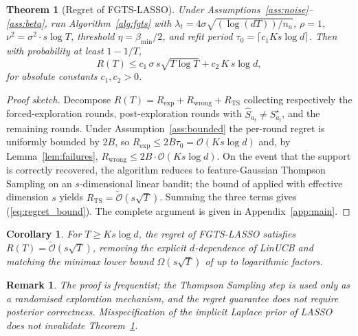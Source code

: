 \documentclass[journal,twoside,web]{ieeecolor}
\newtheorem{theorem}{Theorem}
\newtheorem{corollary}{Corollary}
\newtheorem{remark}{Remark}
\begin{document}
\begin{theorem}[Regret of FGTS-LASSO]\label{thm:main}
Under Assumptions~\ref{ass:noise}--\ref{ass:beta}, run Algorithm~\ref{alg:fgts} with $\lambda_t = 4\sigma\sqrt{(\log(dT))/n_a}$, $\rho = 1$, $\nu^2 = \sigma^2 \cdot s\log T$, threshold $\eta = \beta_{\min}/2$, and refit period $\tau_0 = \lceil c_1 K s\log d\rceil$. Then with probability at least $1 - 1/T$,
\begin{equation}
R(T) \leq c_1\, \sigma\, s\sqrt{T \log T} + c_2\, K\, s \log d,
\label{eq:regret_bound}
\end{equation}
for absolute constants $c_1, c_2 > 0$.
\end{theorem}

\begin{proof}[Proof sketch]
Decompose $R(T) = R_{\mathrm{exp}} + R_{\mathrm{wrong}} + R_{\mathrm{TS}}$ collecting respectively the forced-exploration rounds, post-exploration rounds with $\hat{S}_{a_t} \neq S^{\star}_{a_t}$, and the remaining rounds. Under Assumption~\ref{ass:bounded} the per-round regret is uniformly bounded by $2B$, so $R_{\mathrm{exp}} \leq 2B\tau_0 = \mathcal{O}(Ks\log d)$ and, by Lemma~\ref{lem:failures}, $R_{\mathrm{wrong}} \leq 2B \cdot \mathcal{O}(Ks\log d)$. On the event that the support is correctly recovered, the algorithm reduces to feature-Gaussian Thompson Sampling on an $s$-dimensional linear bandit; the bound of \cite[Thm.~3]{abeille2017linear} applied with effective dimension $s$ yields $R_{\mathrm{TS}} = \tilde{\mathcal{O}}(s\sqrt{T})$. Summing the three terms gives (\ref{eq:regret_bound}). The complete argument is given in Appendix~\ref{app:main}.
\end{proof}

\begin{corollary}\label{cor:rate}
For $T \geq Ks\log d$, the regret of FGTS-LASSO satisfies $R(T) = \tilde{\mathcal{O}}(s\sqrt{T})$, removing the explicit $d$-dependence of LinUCB and matching the minimax lower bound $\Omega(s\sqrt{T})$ of \cite[Thm.~1]{hao2020high} up to logarithmic factors.
\end{corollary}

\begin{remark}
The proof is frequentist; the Thompson Sampling step is used only as a randomised exploration mechanism, and the regret guarantee does not require posterior correctness. Misspecification of the implicit Laplace prior of LASSO does not invalidate Theorem~\ref{thm:main}.
\end{remark}
\end{document}
